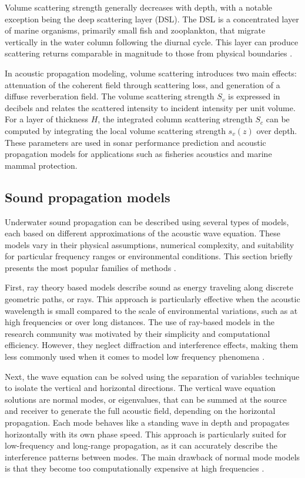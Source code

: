 \documentclass[fleqn]{jaes}
\begin{document}
Volume scattering strength generally decreases with depth, with a notable exception being the deep scattering layer (DSL). The DSL is a concentrated layer of marine organisms, primarily small fish and zooplankton, that migrate vertically in the water column following the diurnal cycle. This layer can produce scattering returns comparable in magnitude to those from physical boundaries \cite{Jensen}.

In acoustic propagation modeling, volume scattering introduces two main effects: attenuation of the coherent field through scattering loss, and generation of a diffuse reverberation field. The volume scattering strength $S_v$ is expressed in decibels and relates the scattered intensity to incident intensity per unit volume. For a layer of thickness $H$, the integrated column scattering strength $S_c$ can be computed by integrating the local volume scattering strength $s_v(z)$ over depth. These parameters are used in sonar performance prediction and acoustic propagation models for applications such as fisheries acoustics and marine mammal protection.

\subsection{Sound propagation models}
Underwater sound propagation can be described using several types of models, each based on different approximations of the acoustic wave equation. These models vary in their physical assumptions, numerical complexity, and suitability for particular frequency ranges or environmental conditions. This section briefly presents the most popular families of methods \cite{propagationmodels, Jensen}.

First, ray theory based models describe sound as energy traveling along discrete geometric paths, or rays. This approach is particularly effective when the acoustic wavelength is small compared to the scale of environmental variations, such as at high frequencies or over long distances. The use of ray-based models in the research community was motivated by their simplicity and computational efficiency. However, they neglect diffraction and interference effects, making them less commonly used when it comes to model low frequency phenomena \cite{hovem2019}.

Next, the wave equation can be solved using the separation of variables technique to isolate the vertical and horizontal directions. The vertical wave equation solutions are normal modes, or eigenvalues, that can be summed at the source and receiver to generate the full acoustic field, depending on the horizontal propagation.
Each mode behaves like a standing wave in depth and propagates horizontally with its own phase speed. This approach is particularly suited for low-frequency and long-range propagation, as it can accurately describe the interference patterns between modes. The main drawback of normal mode models is that they become too computationally expensive at high frequencies \cite{propagationmodels}.
\end{document}
